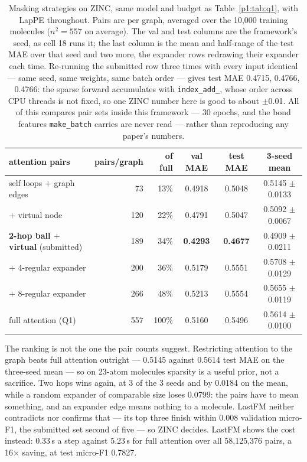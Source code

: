 \begin{table}[H]
\centering
\caption{Masking strategies on ZINC, same model and budget as Table~\ref{p1:tab:q1}, with LapPE throughout. Pairs are per graph, averaged over the 10{,}000 training molecules ($n^2 = 557$ on average). The val and test columns are the framework's seed, as cell 18 runs it; the last column is the mean and half-range of the test MAE over that seed and two more, the expander rows redrawing their expander each time. Re-running the submitted row three times with every input identical --- same seed, same weights, same batch order --- gives test MAE 0.4715, 0.4766, 0.4766: the sparse forward accumulates with \texttt{index\_add\_}, whose order across CPU threads is not fixed, so one ZINC number here is good to about $\pm$0.01. All of this compares pair sets inside this framework --- 30 epochs, and the bond features \texttt{make\_batch} carries are never read --- rather than reproducing any paper's numbers.}
\label{p1:tab:q2}
\small
\begin{tabular}{lrrccc}
\toprule
attention pairs & pairs/graph & of full & val MAE & test MAE & 3-seed mean \\
\midrule
self loops $+$ graph edges & 73 & 13\% & 0.4918 & 0.5048 & 0.5145 $\pm$ 0.0133 \\
$+$ virtual node & 120 & 22\% & 0.4791 & 0.5047 & 0.5092 $\pm$ 0.0067 \\
\textbf{2-hop ball $+$ virtual} (submitted) & 189 & 34\% & \textbf{0.4293} & \textbf{0.4677} & 0.4909 $\pm$ 0.0211 \\
$+$ 4-regular expander & 200 & 36\% & 0.5179 & 0.5551 & 0.5708 $\pm$ 0.0129 \\
$+$ 8-regular expander & 266 & 48\% & 0.5213 & 0.5554 & 0.5655 $\pm$ 0.0119 \\
\midrule
full attention (Q1) & 557 & 100\% & 0.5160 & 0.5496 & 0.5614 $\pm$ 0.0100 \\
\bottomrule
\end{tabular}
\end{table}

The ranking is not the one the pair counts suggest. Restricting attention to the graph beats full attention outright --- 0.5145 against 0.5614 test MAE on the three-seed mean --- so on 23-atom molecules sparsity is a useful prior, not a sacrifice. Two hops wins again, at 3 of the 3 seeds and by 0.0184 on the mean, while a random expander of comparable size loses 0.0799: the pairs have to mean something, and an expander edge means nothing to a molecule. LastFM neither contradicts nor confirms that --- its top three finish within 0.008 validation micro-F1, the submitted set second of five --- so ZINC decides. LastFM shows the cost instead: 0.33\,s a step against 5.23\,s for full attention over all 58{,}125{,}376 pairs, a 16$\times$ saving, at test micro-F1 0.7827.

